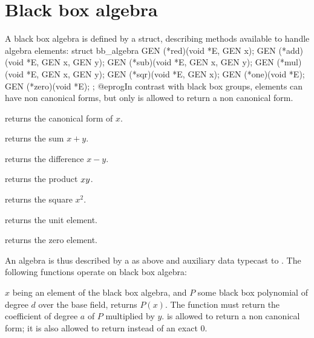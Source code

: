 





\section{Black box algebra}

A black box algebra is defined by a  struct, describing methods
available to handle algebra elements:
\bprog
struct bb_algebra
{
  GEN (*red)(void *E, GEN x);
  GEN (*add)(void *E, GEN x, GEN y);
  GEN (*sub)(void *E, GEN x, GEN y);
  GEN (*mul)(void *E, GEN x, GEN y);
  GEN (*sqr)(void *E, GEN x);
  GEN (*one)(void *E);
  GEN (*zero)(void *E);
};
@eprog\noindent In contrast with black box groups, elements can have non
canonical forms, but only  is allowed to return a non canonical
form.

 returns the canonical form of $x$.

 returns the sum $x+y$.

 returns the difference $x-y$.

 returns the product $x\*y$.

 returns the square $x^2$.

 returns the unit element.

 returns the zero element.

\noindent An algebra is thus described by a  as above
and auxiliary data typecast to . The following functions operate
on black box algebra:

$x$ being an element of the black box algebra, and $P$ some black box
polynomial of degree $d$ over the base field,  returns $P(x)$. The function
 must return the coefficient of degree $a$ of $P$
multiplied by $y$.  is allowed to return a non canonical form;
it is also allowed to return  instead of an exact $0$.


